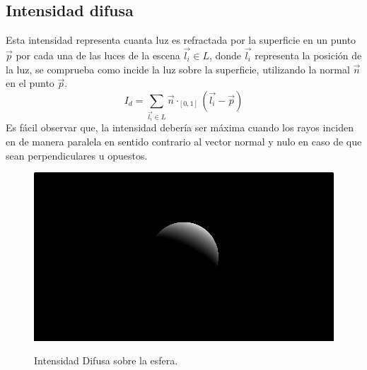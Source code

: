 \subsection{Intensidad difusa}
Esta intensidad representa cuanta luz es refractada por la superficie en un punto \(\Vec{p}\) por cada una de las luces de la escena \(\Vec{l_i}\in L\), donde \(\Vec{l_i}\) representa la posición de la luz, se comprueba como incide la luz sobre la superficie, utilizando la normal \(\Vec{n}\) en el punto \(\Vec{p}\). 
\[I_d = \sum_{\Vec{l_i}\in L} \Vec{n}\cdot_{[0, 1]}(\Vec{l_i}-\Vec{p})\]
Es fácil observar que, la intensidad debería ser máxima cuando los rayos inciden en de manera paralela en sentido contrario al vector normal y nulo en caso de que sean perpendiculares u opuestos.
\begin{figure}[H]
  \centering
  \captionsetup{justification=centering}%
  \includegraphics[width=1.0\textwidth]{secciones/imagenes/lightmodel/difusa.png}\label{fig:difusse}
  \caption{Intensidad Difusa sobre la esfera.}
\end{figure}
